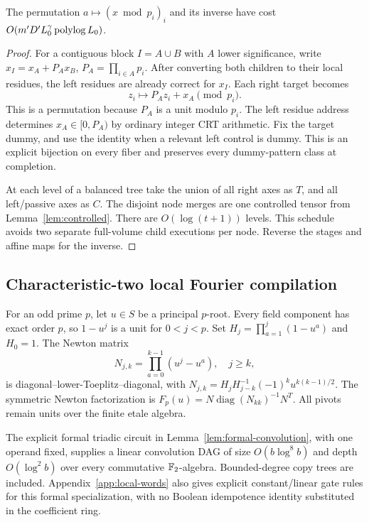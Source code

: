 \begin{lemma}
\label{lem:crt}
The permutation $a\mapsto(x\bmod p_i)_i$ and its inverse have cost
$O(m'D'L_0^\gamma\operatorname{polylog} L_0)$.
\end{lemma}
\begin{proof}
For a contiguous block $I=A\cup B$ with $A$ lower significance,
write $x_I=x_A+P_Ax_B$, $P_A=\prod_{i\in A}p_i$.
After converting both children to their local residues, the left
residues are already correct for $x_I$. Each right target becomes
\[
 z_i\longmapsto P_Az_i+x_A\pmod{p_i}.
\]
This is a permutation because $P_A$ is a unit modulo $p_i$.
The left residue address determines $x_A\in[0,P_A)$ by ordinary
integer CRT arithmetic. Fix the target dummy, and use the identity
when a relevant left control is dummy. This is an explicit bijection
on every fiber and preserves every dummy-pattern class at completion.

At each level of a balanced tree take the union of all right axes as
$T$, and all left/passive axes as $C$. The disjoint node merges are
one controlled tensor from Lemma~\ref{lem:controlled}. There are
$O(\log(t+1))$ levels. This schedule avoids two separate full-volume
child executions per node. Reverse the stages and affine maps for
the inverse.
\end{proof}

\subsection{Characteristic-two local Fourier compilation}

For an odd prime $p$, let $u\in S$ be a principal $p$-root. Every field
component has exact order $p$, so $1-u^j$ is a unit for $0<j<p$.
Set $H_j=\prod_{a=1}^j(1-u^a)$ and $H_0=1$. The Newton matrix
\[
 N_{j,k}=\prod_{a=0}^{k-1}(u^j-u^a),\quad j\ge k,
\]
is diagonal--lower-Toeplitz--diagonal, with
$N_{j,k}=H_jH_{j-k}^{-1}(-1)^k u^{k(k-1)/2}$.
The symmetric Newton factorization is
$F_p(u)=N\operatorname{diag}(N_{kk})^{-1}N^T$.
All pivots remain units over the finite etale algebra.

The explicit formal triadic circuit in
Lemma~\ref{lem:formal-convolution}, with one operand fixed, supplies a
linear convolution DAG of size $O(b\log^8b)$ and depth $O(\log^2b)$
over every commutative $\mathbb F_2$-algebra. Bounded-degree copy trees are
included. Appendix~\ref{app:local-words} also gives explicit constant/linear
gate rules for this formal specialization, with no Boolean
idempotence identity substituted in the coefficient ring.

